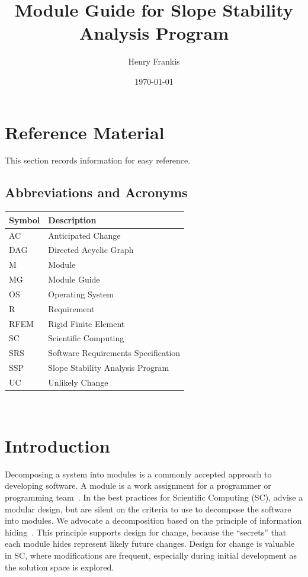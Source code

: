 \documentclass[12pt]{article}
\newcommand{\progname}{SSP}
\begin{document}
\title{Module Guide for Slope Stability Analysis Program} 
\author{Henry Frankis}
\date{\today}
	
\maketitle

\tableofcontents

\newpage

\section{Reference Material}
This section records information for easy reference.
\subsection{Abbreviations and Acronyms}

\renewcommand{\arraystretch}{1.2}
\begin{tabular}{l l} 
  \toprule		
  \textbf{Symbol} & \textbf{Description}\\
  \midrule 
  AC & Anticipated Change\\
  DAG & Directed Acyclic Graph \\
  M & Module \\
  MG & Module Guide \\
  OS & Operating System \\
  R & Requirement\\
  RFEM & Rigid Finite Element \\
  SC & Scientific Computing \\
  SRS & Software Requirements Specification\\
  \progname & Slope Stability Analysis Program\\
  UC & Unlikely Change \\
  \bottomrule
\end{tabular}\\

\section{Introduction}

\hspace{3ex}Decomposing a system into modules is a commonly accepted
approach to developing software.  A module is a work assignment for a
programmer or programming team~\citep{ParnasEtAl1984}.  In the best
practices for Scientific Computing (SC), \citet{WilsonEtAl2013} advise a
modular design, but are silent on the criteria to use to decompose the
software into modules.  We advocate a decomposition based on the
principle of information hiding~\citep{Parnas1972a}.  This principle
supports design for change, because the ``secrets'' that each module
hides represent likely future changes.  Design for change is valuable
in SC, where modifications are frequent, especially during initial
development as the solution space is explored.
\end{document}
